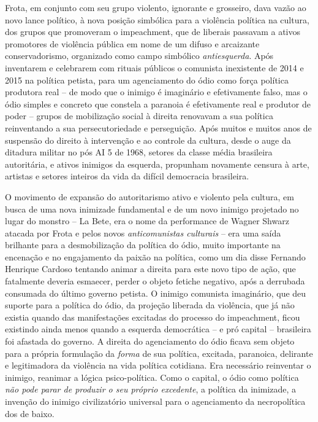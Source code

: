 Frota, em conjunto com seu grupo violento, ignorante e grosseiro, dava
vazão ao novo lance político, à nova posição simbólica para a violência
política na cultura, dos grupos que promoveram o impeachment, que de
liberais passavam a ativos promotores de violência pública em nome de um
difuso e arcaizante conservadorismo, organizado como campo simbólico
\emph{antiesquerda}. Após inventarem e celebrarem com rituais públicos o
comunista inexistente de 2014 e 2015 na política petista, para um
agenciamento do ódio como força política produtora real -- de modo que o
inimigo é imaginário e efetivamente falso, mas o ódio simples e concreto
que constela a paranoia é efetivamente real e produtor de poder --
grupos de mobilização social à direita renovavam a sua política
reinventando a sua persecutoriedade e perseguição. Após muitos e muitos
anos de suspensão do direito à intervenção e ao controle da cultura,
desde o auge da ditadura militar no pós AI 5 de 1968, setores da classe
média brasileira autoritária, e ativos inimigos da esquerda, propunham
novamente censura à arte, artistas e setores inteiros da vida da difícil
democracia brasileira.

O movimento de expansão do autoritarismo ativo e violento pela cultura,
em busca de uma nova inimizade fundamental e de um novo inimigo
projetado no lugar do monstro -- La Bete, era o nome da performance de
Wagner Shwarz atacada por Frota e pelos novos \emph{anticomunistas
culturais} -- era uma saída brilhante para a desmobilização da política
do ódio, muito importante na encenação e no engajamento da paixão na
política, como um dia disse Fernando Henrique Cardoso tentando animar a
direita para este novo tipo de ação, que fatalmente deveria esmaecer,
perder o objeto fetiche negativo, após a derrubada consumada do último
governo petista. O inimigo comunista imaginário, que deu suporte para a
política do ódio, da projeção liberada da violência, que já não existia
quando das manifestações excitadas do processo do impeachment, ficou
existindo ainda menos quando a esquerda democrática -- e pró capital --
brasileira foi afastada do governo. A direita do agenciamento do ódio
ficava sem objeto para a própria formulação da \emph{forma} de sua
política, excitada, paranoica, delirante e legitimadora da violência na
vida política cotidiana. Era necessário reinventar o inimigo, reanimar a
lógica psico-política. Como o capital, o ódio como política \emph{não
pode parar de produzir o seu próprio excedente}, a política da
inimizade, a invenção do inimigo civilizatório universal para o
agenciamento da necropolítica dos de baixo.

